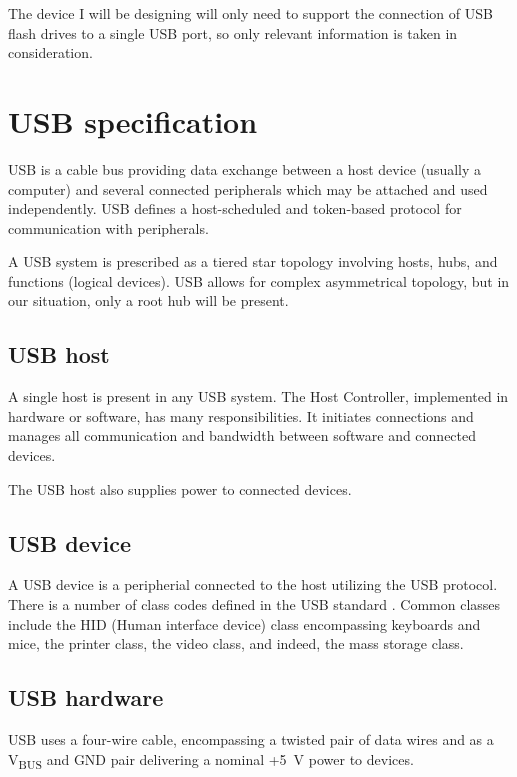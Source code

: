     The device I will be designing will only need to support the connection of USB flash drives to a single USB port, so only relevant information is taken in consideration.
    
    \section{USB specification}
        USB is a cable bus providing data exchange between a host device (usually a computer) and several connected peripherals which may be attached and used independently.  USB defines a host-scheduled and token-based protocol for communication with peripherals.
        
        A USB system is prescribed as a tiered star topology involving hosts, hubs, and functions (logical devices).  USB allows for complex asymmetrical topology, but in our situation, only a root hub will be present.
        
        \subsection{USB host}
            A single host is present in any USB system.  The Host Controller, implemented in hardware or software, has many responsibilities.  It initiates connections and manages all communication and bandwidth between software and connected devices.
            
            The USB host also supplies power to connected devices.
        
        \subsection{USB device}
            A USB device is a peripherial connected to the host utilizing the USB protocol.  There is a number of class codes defined in the USB standard \cite{usb-class-codes}.  Common classes include the HID (Human interface device) class encompassing keyboards and mice, the printer class, the video class, and indeed, the mass storage class. 
        
        \subsection{USB hardware}
            USB uses a four-wire cable, encompassing a twisted pair of data wires and as a V\textsubscript{BUS} and GND pair delivering a nominal +5~V power to devices.
            
